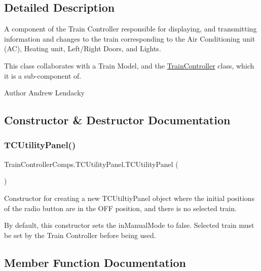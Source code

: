 \subsection{Detailed Description}
A component of the Train Controller responsible for displaying, and transmitting information and changes to the train corresponding to the Air Conditioning unit (AC), Heating unit, Left/\+Right Doors, and Lights. 

This class collaborates with a Train Model, and the \hyperlink{classTrainControllerComps_1_1TrainController}{Train\+Controller} class, which it is a sub-\/component of.

\begin{DoxyAuthor}{Author}
Andrew Lendacky 
\end{DoxyAuthor}


\subsection{Constructor \& Destructor Documentation}
\mbox{\label{classTrainControllerComps_1_1TCUtilityPanel_a0c7caafe2cb3719764e68cdb3e2b86b8}} 
\subsubsection{\texorpdfstring{T\+C\+Utility\+Panel()}{TCUtilityPanel()}}
{\footnotesize\ttfamily Train\+Controller\+Comps.\+T\+C\+Utility\+Panel.\+T\+C\+Utility\+Panel (\begin{DoxyParamCaption}{ }\end{DoxyParamCaption})}



Constructor for creating a new T\+C\+Utiltiy\+Panel object where the initial positions of the radio button are in the \textquotesingle{}O\+FF\textquotesingle{} position, and there is no selected train. 

By default, this constructor sets the \textquotesingle{}in\+Manual\+Mode\textquotesingle{} to false. Selected train must be set by the Train Controller before being used. 

\subsection{Member Function Documentation}
\mbox{\label{classTrainControllerComps_1_1TCUtilityPanel_ab732c67358000f2bfc41eb128eab0e46}} 
